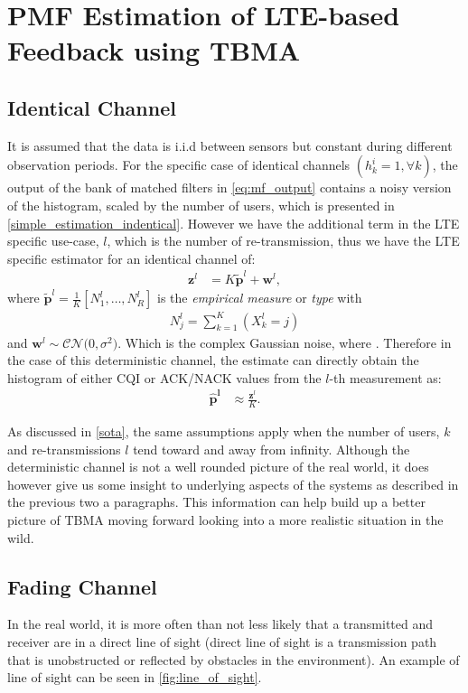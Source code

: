 \documentclass{article}
\begin{document}
\section{PMF Estimation of LTE-based Feedback using TBMA}
\subsection{Identical Channel}\label{det_chan}
It is assumed that the data is i.i.d between sensors but constant during different observation periods. For the specific case of identical channels ${(h^i_k = 1, \forall k)}$, the output of the bank of matched filters in \cref{eq:mf_output} contains a noisy version of the histogram, scaled by the number of users, which is presented in \cref{simple_estimation_indentical}. However we have the additional term in the LTE specific use-case, $l$, which is the number of re-transmission, thus we have the LTE specific estimator for an identical channel of:
%
\begin{align}
    \boldsymbol{z}^l &= K \tilde{\boldsymbol{p}}^l + \boldsymbol{w}^l, 
\end{align}
%
where $\tilde{\boldsymbol{p}}^l = \frac{1}{K}[N_1^l, \ldots, N_R^l]$ is the \emph{empirical measure} or \emph{type} with
\begin{align}
    N_j^l = \sum_{k=1}^K(X^l_k = j)
\end{align}
and $\boldsymbol{w}^l \sim \mathcal{CN}(0, {\sigma^2)}$. Which is the complex Gaussian noise, where .
%
Therefore in the case of this deterministic channel, the estimate can directly obtain the histogram of either CQI or ACK/NACK values from the $l$-th measurement as:
%
\begin{align}
    \boldsymbol{\hat{p}^l} &\approx \frac{\boldsymbol{z}^l}{K}. \label{eq:empf_h_const}
\end{align}

As discussed in \cref{sota}, the same assumptions apply when the number of users, $k$ and re-transmissions $l$ tend toward and away from infinity.
Although the deterministic channel is not a well rounded picture of the real world, it does however give us some insight to underlying aspects of the systems as described in the previous two a paragraphs. This information can help build up a better picture of TBMA moving forward looking into a more realistic situation in the wild.

\subsection{Fading Channel}\label{rand_chan}
In the real world, it is more often than not less likely that a transmitted and receiver are in a direct line of sight (direct line of sight is a transmission path that is unobstructed or reflected by obstacles in the environment). An example of line of sight can be seen in \cref{fig:line_of_sight}.
\end{document}
